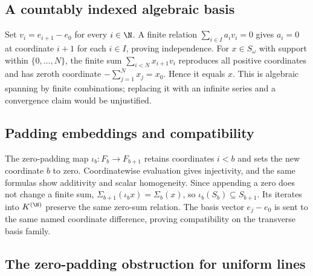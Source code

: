 \subsection{A countably indexed algebraic basis}\label{supp:9-2}
\par{}\par\smallskip

Set $v_i=e_{i+1}-e_0$ for every $i\in\N$. A finite relation $\sum_{i\in I}a_iv_i=0$ gives $a_i=0$ at coordinate $i+1$ for each $i\in I$, proving independence. For $x\in S_\omega$ with support within $\{0,\ldots,N\}$, the finite sum $\sum_{i<N}x_{i+1}v_i$ reproduces all positive coordinates and has zeroth coordinate $-\sum_{j=1}^{N}x_j=x_0$. Hence it equals $x$. This is algebraic spanning by finite combinations; replacing it with an infinite series and a convergence claim would be unjustified.

\subsection{Padding embeddings and compatibility}\label{supp:9-3}
\par{}\par\smallskip

The zero-padding map $\iota_b:F_b\to F_{b+1}$ retains coordinates $i<b$ and sets the new coordinate $b$ to zero. Coordinatewise evaluation gives injectivity, and the same formulas show additivity and scalar homogeneity. Since appending a zero does not change a finite sum, $\Sigma_{b+1}(\iota_bx)=\Sigma_b(x)$, so $\iota_b(S_b)\subseteq S_{b+1}$. Its iterates into $K^{(\N)}$ preserve the same zero-sum relation. The basis vector $e_j-e_0$ is sent to the same named coordinate difference, proving compatibility on the transverse basis family.

\subsection{The zero-padding obstruction for uniform lines}\label{supp:9-4}
\par{}\par\smallskip


